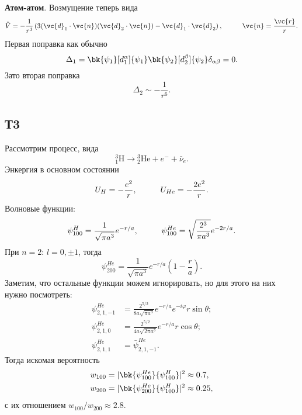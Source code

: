 \textbf{Атом-атом}. Возмущение теперь вида
\begin{equation*}
    \hat{V} = - \frac{1}{r^3} \left(
        3 (\vc{d}_1 \cdot \vc{n}) (\vc{d}_2 \cdot \vc{n}) - \vc{d}_1 \cdot \vc{d}_2
    \right),
    \hspace{10 mm} 
    \vc{n} = \frac{\vc{r}}{r}.
\end{equation*}
Первая поправка как обычно
\begin{equation*}
    \Delta_1 = \bk{\psi_1}[d_1^\alpha]{\psi_1} \bk{\psi_2}[d_2^\beta]{\psi_2} \delta_{\alpha \beta} = 0.
\end{equation*}
Зато вторая поправка
\begin{equation*}
    \Delta_2 \sim - \frac{1}{r^6}.
\end{equation*}




\subsection*{Т3}

Рассмотрим процесс, вида
\begin{equation*}
    {}^3_1 \text{H} \longrightarrow {}_2^3 \text{He} + e^- + \bar{\nu}_e.
\end{equation*}
Энкергия в основном состоянии
\begin{equation*}
    U_H = - \frac{e^2}{r},
    \hspace{10 mm} 
    U_{He} = - \frac{2 e^2}{r}.
\end{equation*}
Волновые функции:
\begin{equation*}
    \psi^H_{100} = \frac{1}{\sqrt{\pi a^3}} e^{-r/a},
    \hspace{10 mm} 
    \psi^{He}_{100} = \sqrt{\frac{2^3}{\pi a^3}} e^{-2r/a}.
\end{equation*}
При $n=2$: $l = 0, \pm 1$, тогда
\begin{equation*}
    \psi^{He}_{200} = \frac{1}{\sqrt{\pi a^3}} e^{- r/a} \left(1 - \frac{r}{a}\right).
\end{equation*}
Заметим, что остальные функции можем игнорировать, но для этого на них нужно посмотреть:
\begin{align*}
    \psi_{2,1,-1}^{He} &= \frac{2^{5/2}}{8 a \sqrt{\pi a^3}} e^{-r/a} e^{- i \varphi} r \sin \theta; \\
    \psi_{2,1,0}^{He} &= \frac{2^{5/2}}{4 a \sqrt{2 \pi a^3} } e^{-r/a} r \cos \theta; \\
    \psi_{2,1,1}^{He} &= \bar{\psi}_{2,1,-1}^{He}.
\end{align*}
Тогда искомая вероятность
\begin{align*}
    w_{100} &= |\bk{\psi^{He}_{100}}{\psi^H_{100}}|^2 \approx 0.7, \\ 
    w_{200} &= |\bk{\psi^{He}_{200}}{\psi^H_{100}}|^2 \approx 0.25,
\end{align*}
с их отношением $w_{100} / w_{200} \approx 2.8$.

